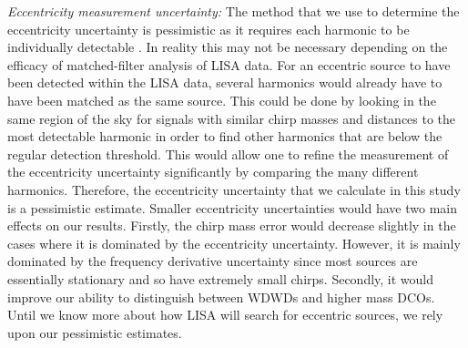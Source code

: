 \textit{Eccentricity measurement uncertainty:} The method that we use to determine the eccentricity uncertainty is pessimistic as it requires each harmonic to be individually detectable \citep[e.g.][]{Lau+2020}. In reality this may not be necessary depending on the efficacy of matched-filter analysis of LISA data. For an eccentric source to have been detected within the LISA data, several harmonics would already have to have been matched as the same source. This could be done by looking in the same region of the sky for signals with similar chirp masses and distances to the most detectable harmonic in order to find other harmonics that are below the regular detection threshold. This would allow one to refine the measurement of the eccentricity uncertainty significantly by comparing the many different harmonics. Therefore, the eccentricity uncertainty that we calculate in this study is a pessimistic estimate. Smaller eccentricity uncertainties would have two main effects on our results. Firstly, the chirp mass error would decrease slightly in the cases where it is dominated by the eccentricity uncertainty. However, it is mainly dominated by the frequency derivative uncertainty since most sources are essentially stationary and so have extremely small chirps. Secondly, it would improve our ability to distinguish between WDWDs and higher mass DCOs. Until we know more about how LISA will search for eccentric sources, we rely upon our pessimistic estimates.